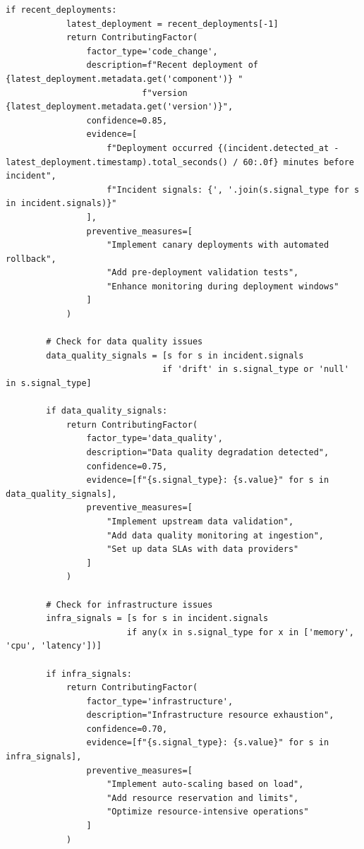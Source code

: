 \begin{lstlisting}[style=python, caption={Post-incident analysis with root cause identification}]
        if recent_deployments:
            latest_deployment = recent_deployments[-1]
            return ContributingFactor(
                factor_type='code_change',
                description=f"Recent deployment of {latest_deployment.metadata.get('component')} "
                           f"version {latest_deployment.metadata.get('version')}",
                confidence=0.85,
                evidence=[
                    f"Deployment occurred {(incident.detected_at - latest_deployment.timestamp).total_seconds() / 60:.0f} minutes before incident",
                    f"Incident signals: {', '.join(s.signal_type for s in incident.signals)}"
                ],
                preventive_measures=[
                    "Implement canary deployments with automated rollback",
                    "Add pre-deployment validation tests",
                    "Enhance monitoring during deployment windows"
                ]
            )

        # Check for data quality issues
        data_quality_signals = [s for s in incident.signals
                               if 'drift' in s.signal_type or 'null' in s.signal_type]

        if data_quality_signals:
            return ContributingFactor(
                factor_type='data_quality',
                description="Data quality degradation detected",
                confidence=0.75,
                evidence=[f"{s.signal_type}: {s.value}" for s in data_quality_signals],
                preventive_measures=[
                    "Implement upstream data validation",
                    "Add data quality monitoring at ingestion",
                    "Set up data SLAs with data providers"
                ]
            )

        # Check for infrastructure issues
        infra_signals = [s for s in incident.signals
                        if any(x in s.signal_type for x in ['memory', 'cpu', 'latency'])]

        if infra_signals:
            return ContributingFactor(
                factor_type='infrastructure',
                description="Infrastructure resource exhaustion",
                confidence=0.70,
                evidence=[f"{s.signal_type}: {s.value}" for s in infra_signals],
                preventive_measures=[
                    "Implement auto-scaling based on load",
                    "Add resource reservation and limits",
                    "Optimize resource-intensive operations"
                ]
            )


\end{lstlisting}
